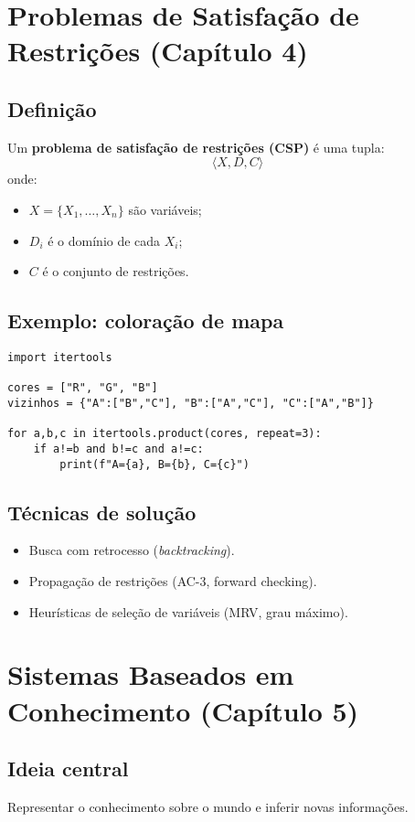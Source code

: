 \documentclass[9pt,a4paper]{extarticle}
\begin{document}
\section{Problemas de Satisfação de Restrições (Capítulo 4)}

\subsection*{Definição}
Um \textbf{problema de satisfação de restrições (CSP)} é uma tupla:
\[
\langle X, D, C \rangle
\]
onde:
\begin{itemize}
  \item $X = \{X_1,\dots,X_n\}$ são variáveis;
  \item $D_i$ é o domínio de cada $X_i$;
  \item $C$ é o conjunto de restrições.
\end{itemize}

\subsection*{Exemplo: coloração de mapa}
\begin{lstlisting}
import itertools

cores = ["R", "G", "B"]
vizinhos = {"A":["B","C"], "B":["A","C"], "C":["A","B"]}

for a,b,c in itertools.product(cores, repeat=3):
    if a!=b and b!=c and a!=c:
        print(f"A={a}, B={b}, C={c}")
\end{lstlisting}

\subsection*{Técnicas de solução}
\begin{itemize}
  \item Busca com retrocesso (\textit{backtracking}).
  \item Propagação de restrições (AC-3, forward checking).
  \item Heurísticas de seleção de variáveis (MRV, grau máximo).
\end{itemize}

\section{Sistemas Baseados em Conhecimento (Capítulo 5)}

\subsection*{Ideia central}
Representar o conhecimento sobre o mundo e inferir novas informações.
\end{document}
